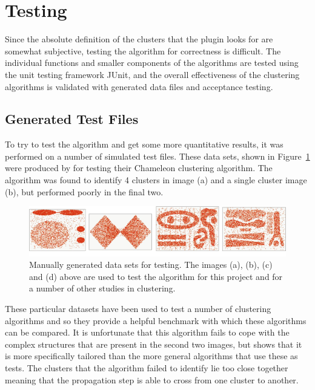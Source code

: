 
\section{Testing}
\label{sec:testing}

Since the absolute definition of the clusters that the plugin looks for are
somewhat subjective, testing the algorithm for correctness is difficult. The
individual functions and smaller components of the algorithms are tested using
the unit testing framework JUnit\cite{tahchiev2010junit}, and the overall
effectiveness of the clustering algorithms is validated with generated data
files and acceptance testing.

\subsection{Generated Test Files}
\label{sub:generated_test_files}

To try to test the algorithm and get some more quantitative results, it was
performed on a number of simulated test files. These data sets, shown in
Figure~\ref{fig:cam-tests} were produced by \citet{karypis1999chameleon} for
testing their Chameleon clustering algorithm. The algorithm was found to
identify 4 clusters in image (a) and a single cluster image (b), but performed
poorly in the final two.

\begin{figure}[tbh]
	\centering
	\includegraphics[width=0.9\linewidth]{cam-tests.png}
	\caption[Manually generated data sets for testing]{Manually generated data
		sets for testing. The images (a), (b), (c) and (d) above are used to
		test the algorithm for this project and for a number of other studies
		in clustering.}\label{fig:cam-tests}
\end{figure}

These particular datasets have been used to test a number of clustering
algorithms and so they provide a helpful benchmark with which these algorithms
can be compared. It is unfortunate that this algorithm fails to cope with the
complex structures that are present in the second two images, but shows that it
is more specifically tailored than the more general algorithms that use these
as tests. The clusters that the algorithm failed to identify lie too close
together meaning that the propagation step is able to cross from one cluster to
another.

